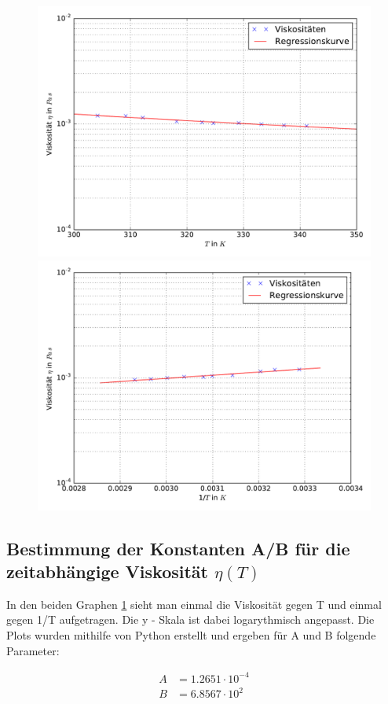 \begin{figure}
  \label{plt:Viskos}
  \includegraphics[height = 10 cm]{Plot_T.pdf}
  \includegraphics[height = 10 cm]{Plot_T_1.pdf}
\end{figure}

\subsection{Bestimmung der Konstanten A/B für die zeitabhängige Viskosität \texorpdfstring{$\eta(T)$}{z}}

In den beiden Graphen \ref{plt:Viskos} sieht man einmal die Viskosität gegen T und einmal gegen 1/T aufgetragen.
Die y - Skala ist dabei logarythmisch angepasst. Die Plots wurden mithilfe von Python erstellt und ergeben
für A und B folgende Parameter:

\begin{align}
  A &= 1.2651 \cdot 10^{-4} \\
  B &= 6.8567 \cdot 10^{2}
\end{align}





